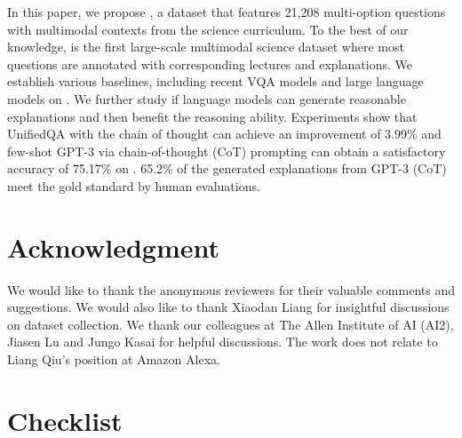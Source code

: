 In this paper, we propose \name{}, a dataset that features 21,208 multi-option questions with multimodal contexts from the science curriculum. To the best of our knowledge, \name{} is the first large-scale multimodal science dataset where most questions are annotated with corresponding lectures and explanations. We establish various baselines, including recent VQA models and large language models on \name{}. We further study if language models can generate reasonable explanations and then benefit the reasoning ability. Experiments show that UnifiedQA with the chain of thought can achieve an improvement of 3.99\% and few-shot GPT-3 via chain-of-thought (CoT) prompting can obtain a satisfactory accuracy of 75.17\% on \name{}. 65.2\% of the generated explanations from GPT-3 (CoT) meet the gold standard by human evaluations.



\section{Acknowledgment}

We would like to thank the anonymous reviewers for their valuable comments and suggestions. We would also like to thank Xiaodan Liang for insightful discussions on dataset collection. We thank our colleagues at The Allen Institute of AI (AI2), Jiasen Lu and Jungo Kasai for helpful discussions. The work does not relate to Liang Qiu's position at Amazon Alexa.


 
{
\small

}


\section*{Checklist}



